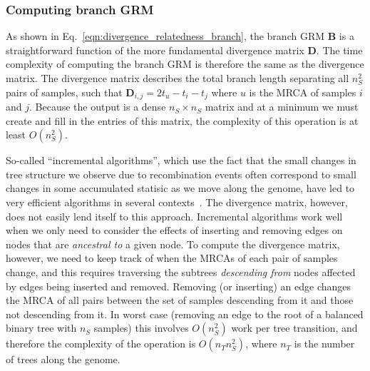 \subsubsection{Computing branch GRM}

As shown in Eq.~\eqref{eqn:divergence_relatedness_branch},
the branch GRM $\mathbf{B}$ is a 
straightforward function of the more fundamental divergence matrix $\mathbf{D}$.
The time complexity of computing the branch GRM is therefore the same as 
the divergence matrix.
The divergence matrix describes
the total branch length separating all $n_S^2$ pairs of samples, such 
that $\mathbf{D}_{i,j} = 2t_u - t_i - t_j$ where $u$ is the MRCA of samples $i$ and $j$.
Because the output is a dense $n_S \times n_S$ matrix 
and at a minimum we must create and fill in the entries of this matrix,
the complexity of this operation is at least $O(n_S^2)$.

So-called ``incremental algorithms'', which use the fact that the 
small changes in tree structure we observe due to recombination events
often correspond to small changes in some accumulated statisic as 
we move along the genome,
have led to very efficient algorithms in several 
contexts~\citep{kelleher2016efficient,ralph2020efficiently,kelleher2020coalescent}. 
The divergence matrix, however, does not easily lend itself to this approach.
Incremental algorithms work well when we only need to consider the effects 
of inserting and removing edges on nodes that are \emph{ancestral to}
a given node. To compute the divergence matrix, however, we need to keep track
of when the MRCAs of each pair of samples change, and this requires 
traversing the subtrees \emph{descending from} nodes affected by 
edges being inserted and removed. Removing (or inserting) an edge changes the MRCA of 
all pairs between the set of samples descending from it 
and those not descending from it. In worst case (removing an edge to the 
root of a balanced binary tree with $n_S$ samples) this involves 
$O(n_S^2)$ work per tree transition, and therefore the complexity of the 
operation is $O(n_T n_S^2)$, where $n_T$ 
is the number of trees along the genome.

